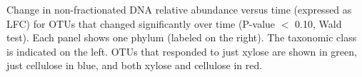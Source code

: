 Change in non-fractionated DNA relative abundance versus time (expressed
as LFC) for OTUs that changed significantly over time (P-value $<$ 0.10, Wald test).
Each panel shows one phylum (labeled on the right). The taxonomic class is
indicated on the left. OTUs that responded to just xylose are shown in 
green, just cellulose in blue, and both xylose and cellulose in red.  

